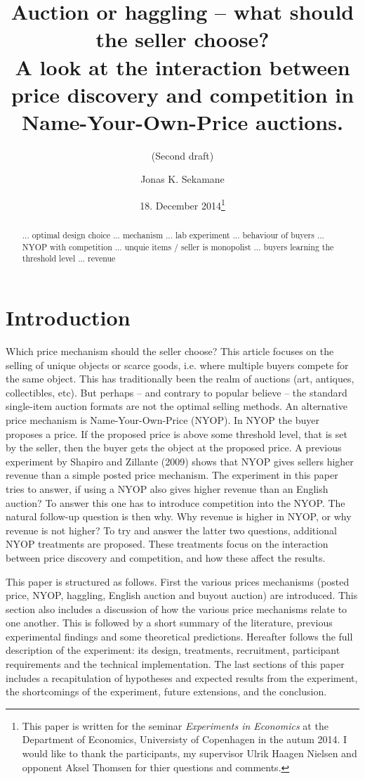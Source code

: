 \documentclass[a4paper,12pt]{article}
\title{\Large {\bf Auction or haggling -- what should the seller choose?} \\ A look at the interaction between price discovery and competition in Name-Your-Own-Price auctions.}
\subtitle{(Second draft)}
\author{Jonas K. Sekamane}
\date{18. December 2014\thanks{This paper is written for the seminar \emph{Experiments in Economics} at the Department of Economics, Universisty of Copenhagen in the autum 2014. I would like to thank the participants, my supervisor Ulrik Haagen Nielsen and opponent Aksel Thomsen for thier questions and comments.}}
\begin{document}
	
	\clearpage
	\thispagestyle{empty}
	
	\maketitle{}
		
	\newpage
	
	\clearpage %
	\setcounter{page}{1}
	
	\begin{abstract}
		{... optimal design choice ... mechanism ... lab experiment ... behaviour of buyers  ... NYOP with competition ... unquie items / seller is monopolist ... buyers learning the threshold level ... revenue}
	\end{abstract}
	
	\tableofcontents
	
	\newpage

	\section{Introduction}

	Which price mechanism should the seller choose? This article focuses on the selling of unique objects or scarce goods, i.e. where multiple buyers compete for the same object. This has traditionally been the realm of auctions (art, antiques, collectibles, etc). But perhaps -- and contrary to popular believe -- the standard single-item auction formats are not the optimal selling methods. An alternative price mechanism is Name-Your-Own-Price (NYOP). In NYOP the buyer proposes a price. If the proposed price is above some threshold level, that is set by the seller, then the buyer gets the object at the proposed price. A previous experiment by Shapiro and Zillante (2009) shows that NYOP gives sellers higher revenue than a simple posted price mechanism. The experiment in this paper tries to answer, if using a NYOP also gives higher revenue than an English auction? To answer this one has to introduce competition into the NYOP. The natural follow-up question is then why. Why revenue is higher in NYOP, or why revenue is not higher? To try and answer the latter two questions, additional NYOP treatments are proposed. These treatments focus on the interaction between price discovery and competition, and how these affect the results.

	This paper is structured as follows. First the various prices mechanisms (posted price, NYOP, haggling, English auction and buyout auction) are introduced. This section also includes a discussion of how the various price mechanisms relate to one another. This is followed by a short summary of the literature, previous experimental findings and some theoretical predictions. Hereafter follows the full description of the experiment: its design, treatments, recruitment, participant requirements and the technical implementation. The last sections of this paper includes a recapitulation of hypotheses and expected results from the experiment, the shortcomings of the experiment, future extensions, and the conclusion.
\end{document}
